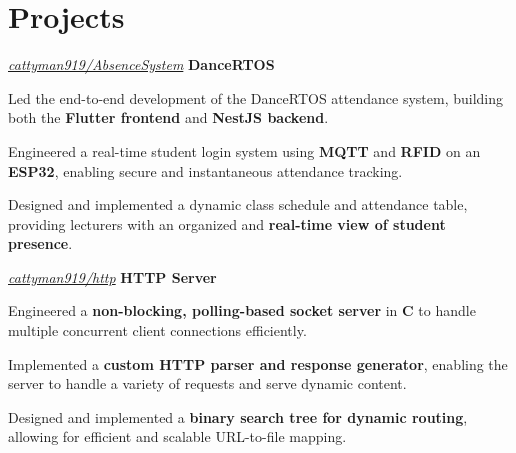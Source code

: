 \documentclass[../main.tex]{subfiles}
\begin{document}
\section{Projects}

\begin{twocolentry}{
    \small
    \textit{\href{https://github.com/cattyman919/AbsenceSystem}{cattyman919/AbsenceSystem}}
}
    \textbf{DanceRTOS}
\end{twocolentry}

\vspace{0.10 cm}
\begin{onecolentry}
\begin{highlights}
    \item Led the end-to-end development of the DanceRTOS attendance system, building both the \textbf{Flutter frontend} and \textbf{NestJS backend}.
    \item Engineered a real-time student login system using \textbf{MQTT} and \textbf{RFID} on an \textbf{ESP32}, enabling secure and instantaneous attendance tracking.
    \item Designed and implemented a dynamic class schedule and attendance table, providing lecturers with an organized and \textbf{real-time view of student presence}.
\end{highlights}
\end{onecolentry}

\vspace{0.2 cm}

\begin{twocolentry}{
    \small
    \textit{\href{https://github.com/cattyman919/http}{cattyman919/http}}
}
    \textbf{HTTP Server}
\end{twocolentry}

\vspace{0.10 cm}
\begin{onecolentry}
\begin{highlights}
    \item Engineered a \textbf{non-blocking, polling-based socket server} in \textbf{C} to handle multiple concurrent client connections efficiently.
    \item Implemented a \textbf{custom HTTP parser and response generator}, enabling the server to handle a variety of requests and serve dynamic content.
    \item Designed and implemented a \textbf{binary search tree for dynamic routing}, allowing for efficient and scalable URL-to-file mapping.
\end{highlights}
\end{onecolentry}
\end{document}
